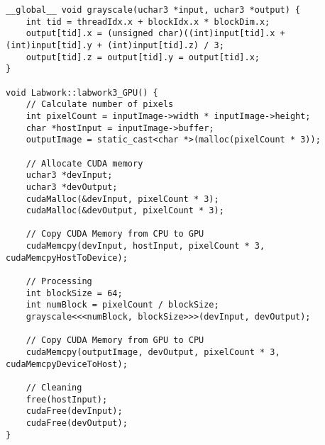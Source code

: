 \documentclass[10pt, a4paper]{article}
\begin{document}
\begin{verbatim}
__global__ void grayscale(uchar3 *input, uchar3 *output) {
    int tid = threadIdx.x + blockIdx.x * blockDim.x;
    output[tid].x = (unsigned char)((int)input[tid].x + (int)input[tid].y + (int)input[tid].z) / 3;
    output[tid].z = output[tid].y = output[tid].x;
}

void Labwork::labwork3_GPU() {
    // Calculate number of pixels
    int pixelCount = inputImage->width * inputImage->height;
    char *hostInput = inputImage->buffer;
    outputImage = static_cast<char *>(malloc(pixelCount * 3));

    // Allocate CUDA memory    
    uchar3 *devInput;
    uchar3 *devOutput;
    cudaMalloc(&devInput, pixelCount * 3);
    cudaMalloc(&devOutput, pixelCount * 3);
    
    // Copy CUDA Memory from CPU to GPU
    cudaMemcpy(devInput, hostInput, pixelCount * 3, cudaMemcpyHostToDevice);

    // Processing
    int blockSize = 64;
    int numBlock = pixelCount / blockSize;
    grayscale<<<numBlock, blockSize>>>(devInput, devOutput);

    // Copy CUDA Memory from GPU to CPU
    cudaMemcpy(outputImage, devOutput, pixelCount * 3, cudaMemcpyDeviceToHost);

    // Cleaning
    free(hostInput);
    cudaFree(devInput);
    cudaFree(devOutput);
}

\end{verbatim}
\end{document}
